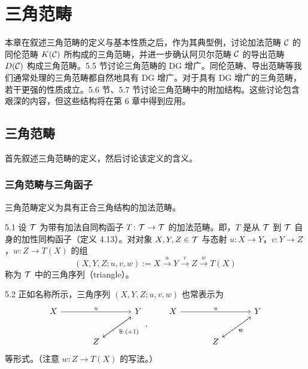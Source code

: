 \chapter{三角范畴}

本章在叙述三角范畴的定义与基本性质之后，作为其典型例，讨论加法范畴 $\mathcal{C}$ 的同伦范畴 $K(\mathcal{C})$ 所构成的三角范畴，并进一步确认阿贝尔范畴 $\mathcal{C}$ 的导出范畴 $D(\mathcal{C})$ 构成三角范畴。5.5 节讨论三角范畴的 DG 增广。同伦范畴、导出范畴等我们通常处理的三角范畴都自然地具有 DG 增广。对于具有 DG 增广的三角范畴，若干更强的性质成立。5.6 节、5.7 节讨论三角范畴中的附加结构。这些讨论包含艰深的内容，但这些结构将在第 6 章中得到应用。

\section{三角范畴}

首先叙述三角范畴的定义，然后讨论该定义的含义。

\subsection{三角范畴与三角函子}

三角范畴定义为具有正合三角结构的加法范畴。


\begin{definition}{5.1}
设 $\mathcal{T}$ 为带有加法自同构函子 $T\colon\mathcal{T}\to\mathcal{T}$ 的加法范畴。即，$T$ 是从 $\mathcal{T}$ 到 $\mathcal{T}$ 自身的加性同构函子（定义 4.13）。对对象 $X,Y,Z\in\mathcal{T}$ 与态射 $u\colon X\to Y$，$v\colon Y\to Z$，$w\colon Z\to T(X)$ 的组
\[
(X,Y,Z;u,v,w) := X \xrightarrow{\,u\,} Y \xrightarrow{\,v\,} Z \xrightarrow{\,w\,} T(X)
\]
称为 $\mathcal{T}$ 中的三角序列（triangle）。
\end{definition}

\begin{remark}{5.2}
正如名称所示，三角序列 $(X,Y,Z;u,v,w)$ 也常表示为
\[
\begin{tikzcd}[row sep=2.2em, column sep=3.4em]
X \arrow[rr,"u"] & & Y \arrow[dl,"v"] \\
{} & Z \arrow[ur,"w\,(+1)"'] &
\end{tikzcd}
,\qquad
\begin{tikzcd}[row sep=2.2em, column sep=3.4em]
X \arrow[rr,"u"] & & Y \arrow[dl,"v"] \\
{} & Z \arrow[ur,dashed,"w"'] &
\end{tikzcd}
\]
等形式。（注意 $w\colon Z\to T(X)$ 的写法。）
\end{remark}

